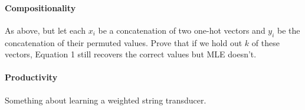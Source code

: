 \documentclass{article}
\begin{document}
\paragraph{Compositionality}
As above, but let each $x_i$ be a concatenation of two one-hot vectors and $y_i$
be the concatenation of their permuted values. Prove that if we hold out $k$ of
these vectors, Equation 1 still recovers the correct values but MLE doesn't.

\paragraph{Productivity}
Something about learning a weighted string transducer.
\end{document}

